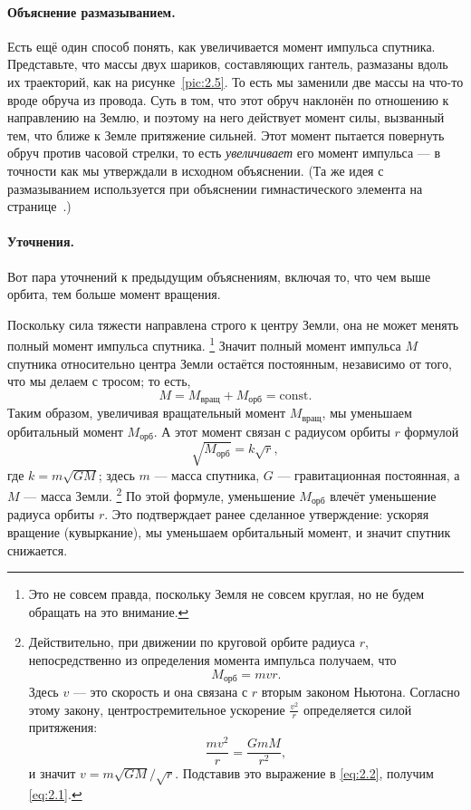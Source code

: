 \paragraph{Объяснение размазыванием.}
Есть ещё один способ понять, как увеличивается момент импульса спутника.
Представьте, что массы двух шариков, составляющих гантель, размазаны вдоль их траекторий,
как на рисунке~\ref{pic:2.5}.
То есть мы заменили две массы на что-то вроде обруча из провода.
Суть в том, что этот обруч наклонён по отношению к направлению на Землю, и поэтому на него действует момент  силы, вызванный тем, что ближе к Земле притяжение сильней.
Этот момент пытается повернуть обруч против часовой стрелки,
то есть \emph{увеличивает} его момент импульса — в точности как мы утверждали в исходном объяснении.
(Та же идея с размазыванием используется при объяснении гимнастического элемента на странице~\pageref{Большие обороты на перекладине}.)

\paragraph{Уточнения.}
Вот пара уточнений к предыдущим объяснениям, включая то, что чем выше орбита, тем больше момент вращения.

Поскольку сила тяжести направлена строго к центру Земли, она не может менять полный момент импульса спутника.%
\footnote{Это не совсем правда, поскольку Земля не совсем круглая, но не будем обращать на это внимание.}
Значит полный момент импульса $M$ спутника относительно центра Земли остаётся постоянным, независимо от того, что мы делаем с тросом; то есть,
\[
M = M_{\text{вращ}} + M_{\text{орб}} = \mathrm{const}.
\]
Таким образом, увеличивая вращательный момент $M_{\text{вращ}}$, мы уменьшаем орбитальный момент $M_{\text{орб}}$.
А этот момент связан с радиусом орбиты $r$ формулой
\begin{equation}
\sqrt{M_{\text{орб}}} = k \sqrt{r}, \label{eq:2.1}
\end{equation}
где $k = m \sqrt{G M}$; здесь $m$ --- масса спутника, $G$ --- гравитационная постоянная, а $M$ --- масса Земли.%
\footnote{Действительно, при движении по круговой орбите радиуса $r$, непосредственно из определения момента импульса получаем, что
\begin{equation}
M_{\text{орб}} = m v r. \label{eq:2.2}
\end{equation}
Здесь $v$ — это скорость и она связана с $r$ вторым законом Ньютона.
Согласно этому закону, центростремительное ускорение $\frac{v^2}{r}$ определяется силой притяжения:
\[
\frac{m  v^2}{r} = \frac{G m M}{r^2},
\]
и значит
$v = m  \sqrt{G M}/\sqrt{r}$.
Подставив это выражение в \eqref{eq:2.2}, получим \eqref{eq:2.1}.}
По этой формуле, уменьшение $M_{\text{орб}}$ влечёт уменьшение радиуса орбиты $r$.
Это подтверждает ранее сделанное утверждение: ускоряя вращение (кувыркание), мы уменьшаем орбитальный момент, и значит спутник снижается.

